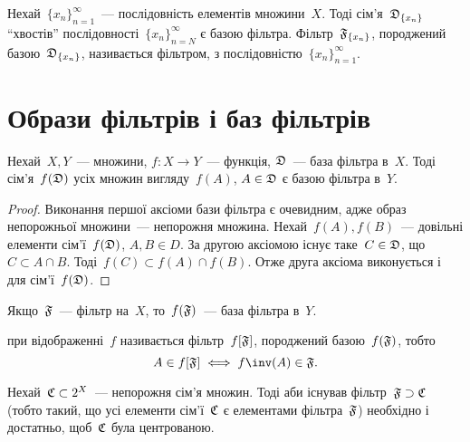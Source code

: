 \begin{definition}
    Нехай~$\{x_n\}_{n = 1}^\infty$~--- послідовність елементів множини~$X$. Тоді сім'я~$\frak D_{\{x_n\}}$ ``хвостів'' послідовності~$\{x_n\}_{n = N}^\infty$ є базою фільтра. Фільтр~$\frak F_{\{x_n\}}$, породжений базою~$\frak D_{\{x_n\}}$, називається фільтром,  з послідовністю~$\{x_n\}_{n = 1}^\infty$.
\end{definition}

\section{Образи фільтрів і баз фільтрів}

\begin{theorem}
    \label{th:filterbase-image-filterbase}
    Нехай~$X, Y$~--- множини, $f: X \to Y$~--- функція, $\frak D$~--- база фільтра в~$X$. Тоді сім'я~$f(\frak D)$ усіх множин вигляду~$f(A)$, $A \in \frak D$ є базою фільтра в~$Y$.
\end{theorem}

\begin{proof}
    Виконання першої аксіоми бази фільтра є очевидним, адже образ непорожньої множини~--- непорожня множина. Нехай~$f(A), f(B)$~--- довільні елементи сім'ї~$f(\frak D)$, $A, B \in D$. За другою аксіомою існує таке~$C \in \frak D$, що~$C \subset A \cap B$. Тоді~$f(C) \subset f(A) \cap f(B)$. Отже друга аксіома виконується і для сім'ї~$f(\frak D)$.
\end{proof}

\begin{corollary}
    \label{th:filter-image-filterbase}
    Якщо~$\frak F$~--- фільтр на~$X$, то~$f(\frak F)$~--- база фільтра в~$Y$.
\end{corollary}

\begin{definition}
     при відображенні~$f$ називається фільтр~$f[\frak F]$, породжений базою~$f(\frak F)$, тобто
    \begin{equation*}
        A \in f[\frak F] \iff f\inv (A) \in \frak F.
    \end{equation*}
\end{definition}

\begin{theorem}
    \label{th:supset-finite-intersection-property}
    Нехай~$\frak C \subset 2^X$~--- непорожня сім'я множин. Тоді аби існував фільтр~$\frak F \supset \frak C$ (тобто такий, що усі елементи сім'ї~$\frak C$ є елементами фільтра~$\frak F$) необхідно і достатньо, щоб~$\frak C$ була центрованою.
\end{theorem}

